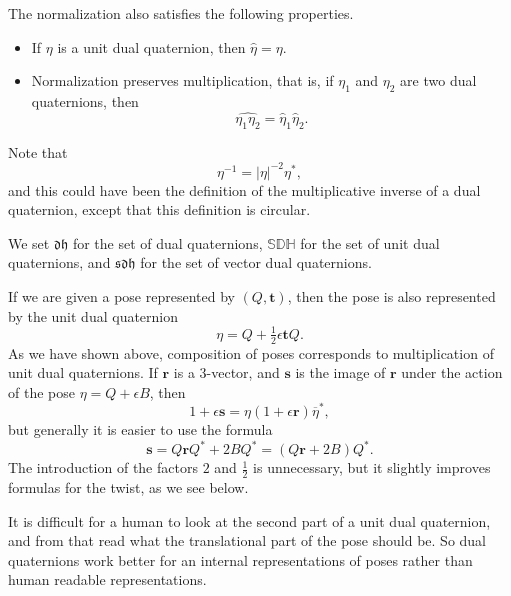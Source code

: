 \documentclass[reqno,12pt]{amsart}
\newcommand\setdualquat{\mathfrak d \mathfrak h}
\newcommand\setunitdualquat{\mathbb S\mathbb D\mathbb H}
\newcommand\setvectordualquat{\mathfrak{s}\mathfrak d \mathfrak h}
\begin{document}
The normalization also satisfies the following properties.
\begin{itemize}
\item If $\eta$ is a unit dual quaternion, then $\widehat\eta = \eta$.
\item Normalization preserves multiplication, that is, if $\eta_1$ and $\eta_2$ are two dual quaternions, then
\begin{equation}
\label{normalize mult}
\widehat{\eta_1 \eta_2} = \widehat \eta_1 \widehat \eta_2 .
\end{equation}
\end{itemize}
Note that
\begin{equation}
\eta^{-1} = |\eta|^{-2} \eta^*,
\end{equation}
and this could have been the definition of the multiplicative inverse of a dual quaternion, except that this definition is circular.

We set $\setdualquat$ for the set of dual quaternions, $\setunitdualquat$ for the set of unit dual quaternions, and $\setvectordualquat$ for the set of vector dual quaternions.

If we are given a pose represented by $(Q, \bm t)$, then the pose is also represented by the unit dual quaternion
\begin{equation}
\label{pose as dual quaternion}
\eta = Q + \tfrac12 \epsilon \bm t Q.
\end{equation}
As we have shown above, composition of poses corresponds to multiplication of unit dual quaternions.  If $\bm r$ is a 3-vector, and $\bm s$ is the image of $\bm r$ under the action of the pose $\eta = Q + \epsilon B$, then
\begin{equation}
\label{defn of pose on 3-vector}
1 + \epsilon \bm s = \eta (1 + \epsilon \bm r) \overline\eta^* ,
\end{equation}
but generally it is easier to use the formula
\begin{equation}
\label{pose on 3-vector}
\bm s = Q \bm r Q^* + 2 B Q^* = (Q \bm r + 2 B) Q^* .
\end{equation}
The introduction of the factors $2$ and $\frac12$ is unnecessary, but it slightly improves formulas for the twist, as we see below.

It is difficult for a human to look at the second part of a unit dual quaternion, and from that read what the translational part of the pose should be.  So dual quaternions work better for an internal representations of poses rather than human readable representations.
\end{document}
